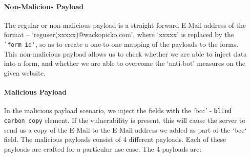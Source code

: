 	\paragraph{Non-Malicious Payload}
		\label{Comp:Fuzzer:nmp}
		The regular or non-malicious payload is a straight forward E-Mail address of the format -- `reguser(xxxxx)@wackopicko.com', where `xxxxx' is replaced by the \lstinline{`form_id'}, so as to create a one-to-one mapping of the payloads to the forms.
		This non-malicious payload allows us to check whether we are able to inject data into a form, and whether we are able to overcome the `anti-bot' measures on the given website.
		
	\paragraph{Malicious Payload}
		\label{Comp:Fuzzer:mp}
		In the malicious payload scenario, we inject the fields with the `bcc' - \lstinline{blind carbon copy} element. If the vulnerability is present, this will cause the server to send us a copy of the E-Mail to the E-Mail address we added as part of the `bcc` field.
		The malicious payloads consist of 4 different payloads. Each of these payloads are crafted for a particular use case. The 4 payloads are:
